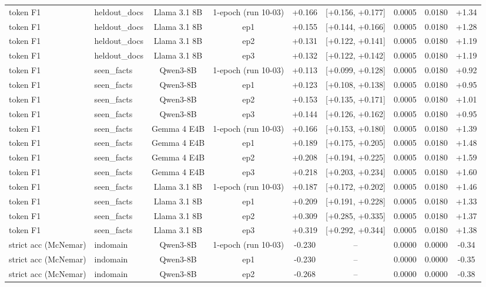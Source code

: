 \begin{table}[t]
{\begin{tabular}{llccccccc}
token F1 & heldout\_docs & Llama 3.1 8B & 1-epoch (run 10-03) & +0.166 & [+0.156, +0.177] & 0.0005 & 0.0180 & +1.34 \\
token F1 & heldout\_docs & Llama 3.1 8B & ep1 & +0.155 & [+0.144, +0.166] & 0.0005 & 0.0180 & +1.28 \\
token F1 & heldout\_docs & Llama 3.1 8B & ep2 & +0.131 & [+0.122, +0.141] & 0.0005 & 0.0180 & +1.19 \\
token F1 & heldout\_docs & Llama 3.1 8B & ep3 & +0.132 & [+0.122, +0.142] & 0.0005 & 0.0180 & +1.19 \\
token F1 & seen\_facts & Qwen3-8B & 1-epoch (run 10-03) & +0.113 & [+0.099, +0.128] & 0.0005 & 0.0180 & +0.92 \\
token F1 & seen\_facts & Qwen3-8B & ep1 & +0.123 & [+0.108, +0.138] & 0.0005 & 0.0180 & +0.95 \\
token F1 & seen\_facts & Qwen3-8B & ep2 & +0.153 & [+0.135, +0.171] & 0.0005 & 0.0180 & +1.01 \\
token F1 & seen\_facts & Qwen3-8B & ep3 & +0.144 & [+0.126, +0.162] & 0.0005 & 0.0180 & +0.95 \\
token F1 & seen\_facts & Gemma 4 E4B & 1-epoch (run 10-03) & +0.166 & [+0.153, +0.180] & 0.0005 & 0.0180 & +1.39 \\
token F1 & seen\_facts & Gemma 4 E4B & ep1 & +0.189 & [+0.175, +0.205] & 0.0005 & 0.0180 & +1.48 \\
token F1 & seen\_facts & Gemma 4 E4B & ep2 & +0.208 & [+0.194, +0.225] & 0.0005 & 0.0180 & +1.59 \\
token F1 & seen\_facts & Gemma 4 E4B & ep3 & +0.218 & [+0.203, +0.234] & 0.0005 & 0.0180 & +1.60 \\
token F1 & seen\_facts & Llama 3.1 8B & 1-epoch (run 10-03) & +0.187 & [+0.172, +0.202] & 0.0005 & 0.0180 & +1.46 \\
token F1 & seen\_facts & Llama 3.1 8B & ep1 & +0.209 & [+0.191, +0.228] & 0.0005 & 0.0180 & +1.33 \\
token F1 & seen\_facts & Llama 3.1 8B & ep2 & +0.309 & [+0.285, +0.335] & 0.0005 & 0.0180 & +1.37 \\
token F1 & seen\_facts & Llama 3.1 8B & ep3 & +0.319 & [+0.292, +0.344] & 0.0005 & 0.0180 & +1.38 \\
strict acc (McNemar) & indomain & Qwen3-8B & 1-epoch (run 10-03) & -0.230 & – & 0.0000 & 0.0000 & -0.34 \\
strict acc (McNemar) & indomain & Qwen3-8B & ep1 & -0.230 & – & 0.0000 & 0.0000 & -0.35 \\
strict acc (McNemar) & indomain & Qwen3-8B & ep2 & -0.268 & – & 0.0000 & 0.0000 & -0.38 \\

\end{tabular}}
\end{table}
